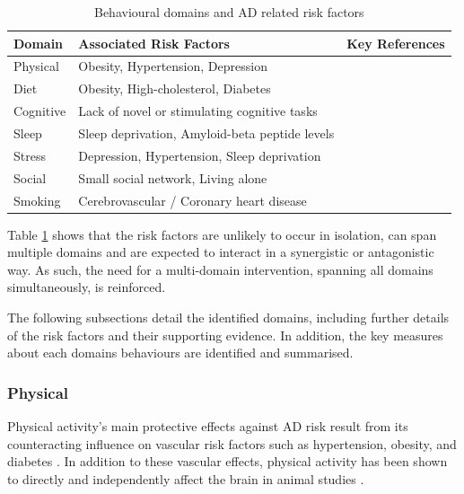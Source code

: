 \begin{table}[h]
\centering
\caption{Behavioural domains and AD related risk factors}
\label{tbl: behavioural domains}
\begin{tabular}{l l c}
\toprule
Domain    & Associated Risk Factors & Key References \\ 	\midrule
Physical  & Obesity, Hypertension, Depression    & \cite{Hamer2009,Angevaren2010,Gelber2012,Buchman2012,Alonso2009,Dahl2010} \\
Diet      & Obesity, High-cholesterol, Diabetes & \cite{Lu2009,Dahl2010,Alonso2009,Creavin2012,Gaussoin2012,Gu2010,Gu2010a,Shatenstein2012} \\
Cognitive & Lack of novel or stimulating cognitive tasks & \cite{Anstey2013a,Marquie2010,Wilson2012,Valenzuela2011,Unverzagt2012} \\
Sleep     & Sleep deprivation, Amyloid-beta peptide levels & \cite{Scullin2015,DiMeco2014,Rothman2013,Musiek2015} \\
Stress	  & Depression, Hypertension, Sleep deprivation	 & \cite{Diniz2013,Boyle2010,Dotson2010,Royall2012,Potvin2011} \\
Social    & Small social network, Living alone & \cite{Frati2011, Saczynski2006, Amieva2010} \\
Smoking	  & Cerebrovascular / Coronary heart disease  & \cite{Gaussoin2012,Gelber2012,Barnes2011,Durazzo2014,Rusanen2011} \\	\bottomrule

\end{tabular}
\end{table}

Table \ref{tbl: behavioural domains} shows that the risk factors are unlikely to occur in isolation, can span multiple domains and are expected to interact in a synergistic or antagonistic way. As such, the need for a multi-domain intervention, spanning all domains simultaneously, is reinforced.

The following subsections detail the identified domains, including further details of the risk factors and their supporting evidence. In addition, the key measures about each domains behaviours are identified and summarised.

\subsubsection{Physical}
Physical activity's main protective effects against AD risk result from its counteracting influence on vascular risk factors such as hypertension, obesity, and diabetes \cite{Hughes2010,Angevaren2010}.
In addition to these vascular effects, physical activity has been shown to directly and independently affect the brain in animal studies \cite{Voss2013}.

